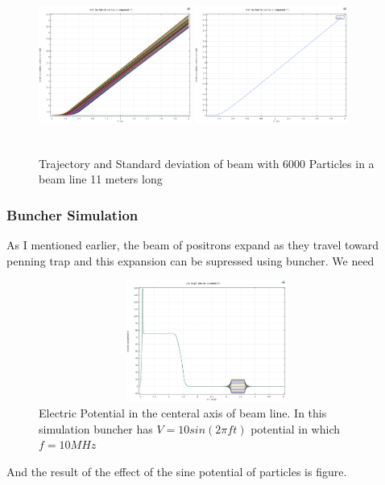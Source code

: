 \documentclass[12pt,a4paper]{article}
\begin{document}
\begin{figure}[h]
\centering
\includegraphics[width=50mm, height=50mm]{sim-in-100-11met}
\includegraphics[width=50mm, height=50mm]{sim-std-100-11met}
\caption{Trajectory and Standard deviation of beam with 6000 Particles in a beam line 11 meters long }
\end{figure}

\subsubsection{Buncher Simulation}
As I mentioned earlier, the beam of positrons expand as they travel toward penning trap and this expansion can be supressed using buncher. We need

\begin{figure}[h]
\centering
\includegraphics[width=110mm, height=40mm]{potential_buncher}
\caption{Electric Potential in the centeral axis of beam line. In this simulation buncher has $ V = 10 sin(2 \pi f t) $ potential in which $ f=10 MHz $}
\end{figure}

And the result of the effect of the sine potential of particles is figure.
\end{document}
